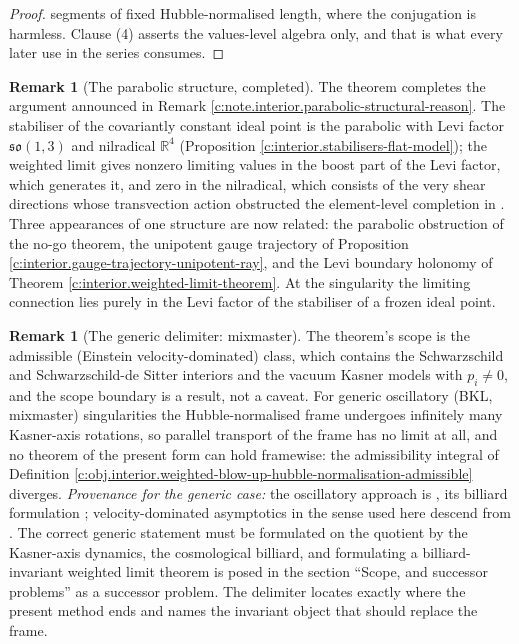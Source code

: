 \documentclass[11pt]{article}
\theoremstyle{definition}
\newtheorem{remark}[theorem]{Remark}
\theoremstyle{plain}
\providecommand{\R}{}\renewcommand{\R}{\mathbb{R}}
\begin{document}
\begin{proof}
segments of fixed Hubble-normalised length, where the conjugation is harmless. Clause (4) asserts the values-level algebra only, and that is what every later use in the series consumes.

\end{proof}

\begin{remark}[The parabolic structure, completed]\label{c:note.interior.parabolic-structure-completed}
The theorem completes the argument announced in Remark \ref{c:note.interior.parabolic-structural-reason}. The stabiliser of the covariantly constant ideal point is the parabolic with Levi factor $\mathfrak{so}(1,3)$ and nilradical $\R^4$ (Proposition \ref{c:interior.stabilisers-flat-model}); the weighted limit gives nonzero limiting values in the boost part of the Levi factor, which generates it, and zero in the nilradical, which consists of the very shear directions whose transvection action obstructed the element-level completion in \cite[Thm.~4.2]{ButlerT1}. Three appearances of one structure are now related: the parabolic obstruction of the no-go theorem, the unipotent gauge trajectory of Proposition \ref{c:interior.gauge-trajectory-unipotent-ray}, and the Levi boundary holonomy of Theorem \ref{c:interior.weighted-limit-theorem}. At the singularity the limiting connection lies purely in the Levi factor of the stabiliser of a frozen ideal point.
\end{remark}

\begin{remark}[The generic delimiter: mixmaster]\label{c:note.interior.generic-delimiter-mixmaster}
The theorem's scope is the admissible (Einstein velocity-dominated) class, which contains the Schwarzschild and Schwarzschild-de Sitter interiors and the vacuum Kasner models with $p_i \neq 0$, and the scope boundary is a result, not a caveat. For generic oscillatory (BKL, mixmaster) singularities the Hubble-normalised frame undergoes infinitely many Kasner-axis rotations, so parallel transport of the frame has no limit at all, and no theorem of the present form can hold framewise: the admissibility integral of Definition \ref{c:obj.interior.weighted-blow-up-hubble-normalisation-admissible} diverges. \emph{Provenance for the generic case:} the oscillatory approach is \cite{BKL1970}, its billiard formulation \cite{DHN2003}; velocity-dominated asymptotics in the sense used here descend from \cite{ELS1972, IsenbergMoncrief1990}. The correct generic statement must be formulated on the quotient by the Kasner-axis dynamics, the cosmological billiard, and formulating a billiard-invariant weighted limit theorem is posed in the section ``Scope, and successor problems'' as a successor problem. The delimiter locates exactly where the present method ends and names the invariant object that should replace the frame.
\end{remark}
\end{document}
